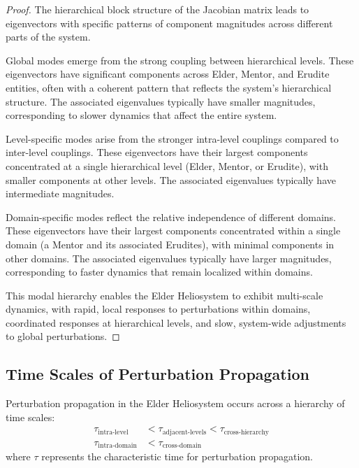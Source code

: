\begin{proof}
The hierarchical block structure of the Jacobian matrix leads to eigenvectors with specific patterns of component magnitudes across different parts of the system.

Global modes emerge from the strong coupling between hierarchical levels. These eigenvectors have significant components across Elder, Mentor, and Erudite entities, often with a coherent pattern that reflects the system's hierarchical structure. The associated eigenvalues typically have smaller magnitudes, corresponding to slower dynamics that affect the entire system.

Level-specific modes arise from the stronger intra-level couplings compared to inter-level couplings. These eigenvectors have their largest components concentrated at a single hierarchical level (Elder, Mentor, or Erudite), with smaller components at other levels. The associated eigenvalues typically have intermediate magnitudes.

Domain-specific modes reflect the relative independence of different domains. These eigenvectors have their largest components concentrated within a single domain (a Mentor and its associated Erudites), with minimal components in other domains. The associated eigenvalues typically have larger magnitudes, corresponding to faster dynamics that remain localized within domains.

This modal hierarchy enables the Elder Heliosystem to exhibit multi-scale dynamics, with rapid, local responses to perturbations within domains, coordinated responses at hierarchical levels, and slow, system-wide adjustments to global perturbations.
\end{proof}

\subsection{Time Scales of Perturbation Propagation}

\begin{theorem}
Perturbation propagation in the Elder Heliosystem occurs across a hierarchy of time scales:
\begin{align}
\tau_{\text{intra-level}} &< \tau_{\text{adjacent-levels}} < \tau_{\text{cross-hierarchy}} \\
\tau_{\text{intra-domain}} &< \tau_{\text{cross-domain}}
\end{align}
where $\tau$ represents the characteristic time for perturbation propagation.
\end{theorem}

